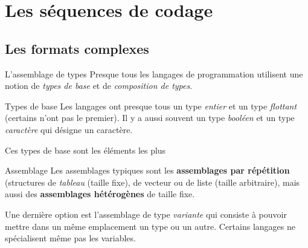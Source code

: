 \section{Les séquences de codage}
\subsection{Les formats complexes}
\begin{frame}{L'assemblage de types}
  Presque tous les langages de programmation utilisent une notion de
  \emph{types de base} et de \emph{composition de types}.
  \begin{block}{Types de base}
    Les langages ont presque tous un type \emph{entier} et un type
    \emph{flottant} (certains n'ont pas le premier). Il y a aussi souvent un
    type \emph{booléen} et un type \emph{caractère} qui désigne un caractère.

    Ces types de base sont les éléments les plus
  \end{block}
  \begin{block}{Assemblage}
    Les assemblages typiques sont les \textbf{assemblages par répétition}
    (structures de \emph{tableau} (taille fixe), de vecteur ou de liste
    (taille arbitraire), mais aussi des \textbf{assemblages hétérogènes} de
    taille fixe.

    Une dernière option est l'assemblage de type \emph{variante} qui consiste
    à pouvoir mettre dans un même emplacement un type ou un autre. Certains
    langages ne spécialisent même pas les variables.
  \end{block}
\end{frame}

